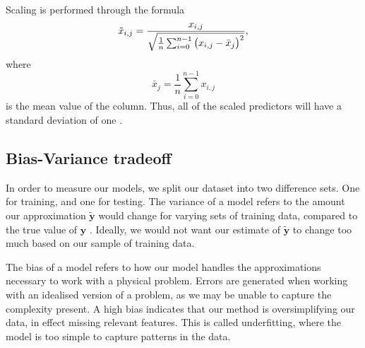 \documentclass{article}
\begin{document}
Scaling is performed through the formula
\begin{equation*}
    \tilde{x}_{i,j} = \frac{x_{i,j}}{\sqrt{\frac{1}{n} \sum_{i=0}^{n-1} \left( x_{i,j} - \Bar{x}_j \right)^2 }},
\end{equation*}
where 
\begin{equation*}
    \bar{x}_j = \frac{1}{n} \sum_{i=0}^{n-1} x_{i,j}
\end{equation*}
is the mean value of the column. Thus, all of the scaled predictors will have a standard deviation of one \cite[p.~237]{james2021introduction}.

\subsection{Bias-Variance tradeoff}
In order to measure our models, we split our dataset into two difference sets. One for training, and one for testing. The variance of a model refers to the amount our approximation $\boldsymbol{\tilde{y}}$ would change for varying sets of training data, compared to the true value of $\boldsymbol{y}$ \cite[p.~34]{james2021introduction}. Ideally, we would not want our estimate of $\boldsymbol{\tilde{y}}$ to change too much based on our sample of training data.

The bias of a model refers to how our model handles the approximations necessary to work with a physical problem. Errors are generated when working with an idealised version of a problem, as we may be unable to capture the complexity present. A high bias indicates that our method is oversimplifying our data, in effect missing relevant features. This is called underfitting, where the model is too simple to capture patterns in the data.
\end{document}
